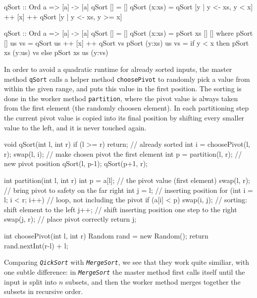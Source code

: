 \begin{haskellcode}
  qSort :: Ord a => [a] -> [a]
  qSort [] = []
  qSort (x:xs) = qSort [y | y <- xs, y < x] ++ [x] ++
                 qSort [y | y <- xs, y >= x]

  qSort :: Ord a => [a] -> [a]
  qSort [] = []
  qSort (x:xs) = pSort xs [] []
      where
      pSort [] us vs = qSort us ++ [x] ++ qSort vs
      pSort (y:xs) us vs = if y < x
                           then pSort xs (y:us) vs
                           else pSort xs us (y:vs)
\end{haskellcode}

\begin{impl}
In order to avoid a quadratic runtime for already sorted inputs, the master method \texttt{qSort} calls a helper method \texttt{choosePivot} to randomly pick a value from within the given range, and puts this value in the first position.
The sorting is done in the worker method \texttt{partition}, where the pivot value is always taken from the first element (the randomly choosen element).
In each partitioning step the current pivot value is copied into its final position by shifting every smaller value to the left, and it is never touched again.
\end{impl}

\begin{javacode}
void qSort(int l, int r) {
    if (l >= r) return; // already sorted
    int i = choosePivot(l, r);
    swap(l, i); // make chosen pivot the first element
    int p = partition(l, r); // new pivot position
    qSort(l, p-1);
    qSort(p+1, r);
}

int partition(int l, int r) {
    int p = a[l]; // the pivot value (first element)
    swap(l, r); // bring pivot to safety on the far right
    int j = l; // inserting position
    for (int i = l; i < r; i++) { // loop, not including the pivot
        if (a[i] < p) {
            swap(i, j); // sorting: shift element to the left
            j++; // shift inserting position one step to the right
        }
    }
    swap(j, r); // place pivot correctly
    return j;
}

int choosePivot(int l, int r) {
    Random rand = new Random();
    return rand.nextInt(r-l) + l;
}
\end{javacode}

Comparing \emph{\texttt{QickSort}} with \emph{\texttt{MergeSort}}, we see that they work quite similiar, with one subtle difference:
in \emph{\texttt{MergeSort}} the master method first calls itself until the input is split into $n$ subsets, and then the worker method merges together the subsets in recursive order.

